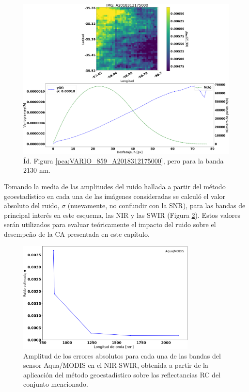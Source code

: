             \begin{figure}
            \centering
            \includegraphics[width=\textwidth]{pca/figures/VARIO_2130_A2018312175000.png}
            \caption{Íd. Figura \ref{pca:VARIO_859_A2018312175000}, pero para la banda $2130$ nm.}
            \label{pca:VARIO_2130_A2018312175000}
            \end{figure}
            
            Tomando la media de las amplitudes del ruido hallada a partir del método geoestadístico en cada una de las imágenes consideradas se calculó el valor absoluto del ruido, $\sigma$ (nuevamente, no confundir con la SNR), para las bandas de principal interés en este esquema, las NIR y las SWIR (Figura \ref{pca:variogram_sigma}). Estos valores serán utilizados para evaluar teóricamente el impacto del ruido sobre el desempeño de la CA presentada en este capítulo.
            
            \begin{figure}
            \centering
            \includegraphics[width=0.8\textwidth]{pca/figures/variogram_sigma.png}
            \caption[Amplitud de los errores absolutos para cada una de las bandas del sensor Aqua/MODIS en el NIR-SWIR.]{Amplitud de los errores absolutos para cada una de las bandas del sensor Aqua/MODIS en el NIR-SWIR, obtenida a partir de la aplicación del método geoestadístico sobre las reflectancias RC del conjunto mencionado.}
            \label{pca:variogram_sigma}
            \end{figure}

